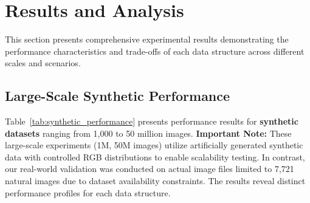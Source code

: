 \documentclass{sbc2023}
\begin{document}
\section{Results and Analysis}
\label{sec:results}

This section presents comprehensive experimental results demonstrating the performance characteristics and trade-offs of each data structure across different scales and scenarios.

\subsection{Large-Scale Synthetic Performance}

Table~\ref{tab:synthetic_performance} presents performance results for \textbf{synthetic datasets} ranging from 1,000 to 50 million images. \textbf{Important Note:} These large-scale experiments (1M, 50M images) utilize artificially generated synthetic data with controlled RGB distributions to enable scalability testing. In contrast, our real-world validation was conducted on actual image files limited to 7,721 natural images due to dataset availability constraints. The results reveal distinct performance profiles for each data structure.
\end{document}
